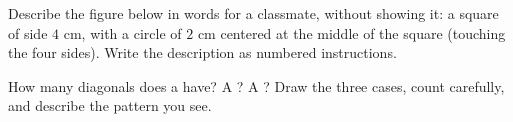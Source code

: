 \begin{exercise}[$\star\star$]\label{exo:g4:geometry:10}
Describe the figure below in words for a classmate, without showing
it: a square of side $4$ cm, with a circle of  $2$ cm centered
at the middle of the square (touching the four sides). Write the
description as numbered instructions.
\end{exercise}

\begin{exercise}[$\star\star$]\label{exo:g4:geometry:11}
How many diagonals does a  have? A ? A ?
Draw the three cases, count carefully, and describe the pattern you
see.
\end{exercise}
